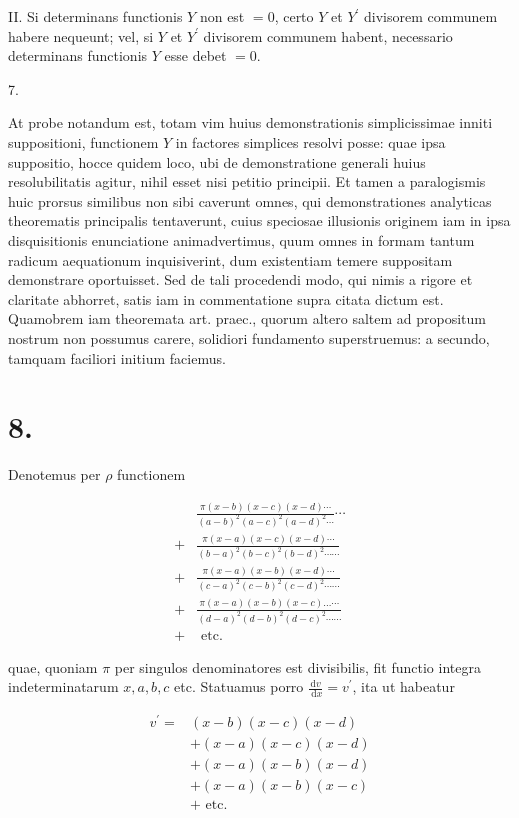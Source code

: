 \documentclass[10pt]{article}
\begin{document}
II. Si determinans functionis \(Y\) non est \(=0\), certo \(Y\) et \(Y^{\prime}\) divisorem communem habere nequeunt; vel, si \(Y\) et \(Y^{\prime}\) divisorem communem habent, necessario determinans functionis \(Y\) esse debet \(=0\).

7.

At probe notandum est, totam vim huius demonstrationis simplicissimae inniti suppositioni, functionem \(Y\) in factores simplices resolvi posse: quae ipsa suppositio, hocce quidem loco, ubi de demonstratione generali huius resolubilitatis agitur, nihil esset nisi petitio principii. Et tamen a paralogismis huic prorsus similibus non sibi caverunt omnes, qui demonstrationes analyticas theorematis principalis tentaverunt, cuius speciosae illusionis originem iam in ipsa disquisitionis enunciatione animadvertimus, quum omnes in formam tantum radicum aequationum inquisiverint, dum existentiam temere suppositam demonstrare oportuisset. Sed de tali procedendi modo, qui nimis a rigore et claritate abhorret, satis iam in commentatione supra citata dictum est. Quamobrem iam theoremata art. praec.,
quorum altero saltem ad propositum nostrum non possumus carere, solidiori fundamento superstruemus: a secundo, tamquam faciliori initium faciemus.

\section*{8.}
Denotemus per \(\rho\) functionem

\[
\begin{aligned}
& \frac{\pi(x-b)(x-c)(x-d) \cdots}{(a-b)^{2}(a-c)^{2}(a-d)^{2} \cdots} \cdots \\
+ & \frac{\pi(x-a)(x-c)(x-d) \cdots}{(b-a)^{2}(b-c)^{2}(b-d)^{2} \cdots \cdots} \\
+ & \frac{\pi(x-a)(x-b)(x-d) \cdots}{(c-a)^{2}(c-b)^{2}(c-d)^{2} \cdots \cdots} \\
+ & \frac{\pi(x-a)(x-b)(x-c) \ldots \cdots}{(d-a)^{2}(d-b)^{2}(d-c)^{2} \cdots \cdots} \\
+ & \text { etc. }
\end{aligned}
\]

quae, quoniam \(\pi\) per singulos denominatores est divisibilis, fit functio integra indeterminatarum \(x, a, b, c\) etc. Statuamus porro \(\frac{\mathrm{d} v}{\mathrm{~d} x}=v^{\prime}\), ita ut habeatur

\[
\begin{aligned}
v^{\prime}= & (x-b)(x-c)(x-d) \\
& +(x-a)(x-c)(x-d) \\
& +(x-a)(x-b)(x-d) \\
& +(x-a)(x-b)(x-c) \\
& + \text { etc. }
\end{aligned}
\]
\end{document}
